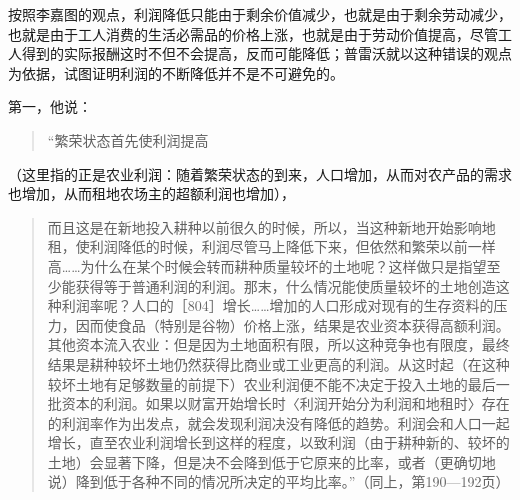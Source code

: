 按照李嘉图的观点，利润降低只能由于剩余价值减少，也就是由于剩余劳动减少，也就是由于工人消费的生活必需品的价格上涨，也就是由于劳动价值提高，尽管工人得到的实际报酬这时不但不会提高，反而可能降低；普雷沃就以这种错误的观点为依据，试图证明利润的不断降低并不是不可避免的。

第一，他说：

\begin{quote}{“繁荣状态首先使利润提高}\end{quote}

（这里指的正是农业利润：随着繁荣状态的到来，人口增加，从而对农产品的需求也增加，从而租地农场主的超额利润也增加），

\begin{quote}{而且这是在新地投入耕种以前很久的时候，所以，当这种新地开始影响地租，使利润降低的时候，利润尽管马上降低下来，但依然和繁荣以前一样高……为什么在某个时候会转而耕种质量较坏的土地呢？这样做只是指望至少能获得等于普通利润的利润。那末，什么情况能使质量较坏的土地创造这种利润率呢？人口的［804］增长……增加的人口形成对现有的生存资料的压力，因而使食品（特别是谷物）价格上涨，结果是农业资本获得高额利润。其他资本流入农业：但是因为土地面积有限，所以这种竞争也有限度，最终结果是耕种较坏土地仍然获得比商业或工业更高的利润。从这时起（在这种较坏土地有足够数量的前提下）农业利润便不能不决定于投入土地的最后一批资本的利润。如果以财富开始增长时〈利润开始分为利润和地租时〉存在的利润率作为出发点，就会发现利润决没有降低的趋势。利润会和人口一起增长，直至农业利润增长到这样的程度，以致利润（由于耕种新的、较坏的土地）会显著下降，但是决不会降到低于它原来的比率，或者（更确切地说）降到低于各种不同的情况所决定的平均比率。”（同上，第190—192页）}\end{quote}

